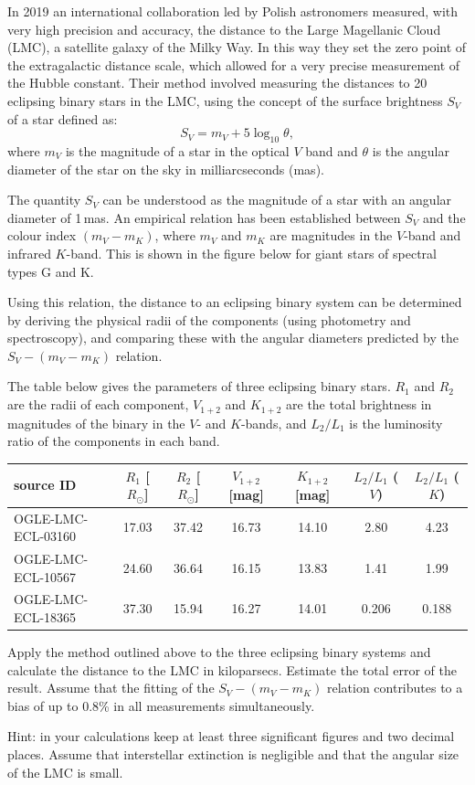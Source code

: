 In 2019 an international collaboration led by Polish astronomers measured,
with very high precision and accuracy, the distance to the Large Magellanic
Cloud (LMC), a satellite galaxy of the Milky Way. In this way they set the
zero point of the extragalactic distance scale, which allowed for a very
precise measurement of the Hubble constant. Their method involved measuring
the distances to 20 eclipsing binary stars in the LMC, using the concept of
the surface brightness $S_V$ of a star defined as:
\[ S_V = m_V + 5 \log_{10} \theta, \]
where $m_V$ is the magnitude of a star in the optical $V$ band and $\theta$ is
the angular diameter of the star on the sky in milliarcseconds (mas).

The quantity $S_V$ can be understood as the magnitude of a star with an
angular diameter of 1\,mas. An empirical relation has been established between
$S_V$ and the colour index $(m_V - m_K)$, where $m_V$ and $m_K$ are magnitudes
in the $V$-band and infrared $K$-band. This is shown in the figure below for
giant stars of spectral types G and K.


Using this relation, the distance to an eclipsing binary system can be
determined by deriving the physical radii of the components (using photometry
and spectroscopy), and comparing these with the angular diameters predicted by
the $S_V - (m_V - m_K)$ relation.

The table below gives the parameters of three eclipsing binary stars. $R_1$
and $R_2$ are the radii of each component, $V_{1+2}$ and $K_{1+2}$ are the
total brightness in magnitudes of the binary in the $V$- and $K$-bands, and
$L_2/L_1$ is the luminosity ratio of the components in each band.

\begin{center}
\begin{tabular}{l|c|c|c|c|c|c}
source ID & $R_1$ [$R_\odot$] & $R_2$ [$R_\odot$] & $V_{1+2}$ [mag]
  & $K_{1+2}$ [mag] & $L_2/L_1$ ($V$) & $L_2/L_1$ ($K$) \\
\hline
OGLE-LMC-ECL-03160 & 17.03 & 37.42 & 16.73 & 14.10 & 2.80  & 4.23  \\
OGLE-LMC-ECL-10567 & 24.60 & 36.64 & 16.15 & 13.83 & 1.41  & 1.99  \\
OGLE-LMC-ECL-18365 & 37.30 & 15.94 & 16.27 & 14.01 & 0.206 & 0.188 \\
\end{tabular}
\end{center}

Apply the method outlined above to the three eclipsing binary systems and
calculate the distance to the LMC in kiloparsecs. Estimate the total error of
the result. Assume that the fitting of the $S_V - (m_V - m_K)$ relation
contributes to a bias of up to 0.8\% in all measurements simultaneously.

Hint: in your calculations keep at least three significant figures and two
decimal places. Assume that interstellar extinction is negligible and that the
angular size of the LMC is small.
